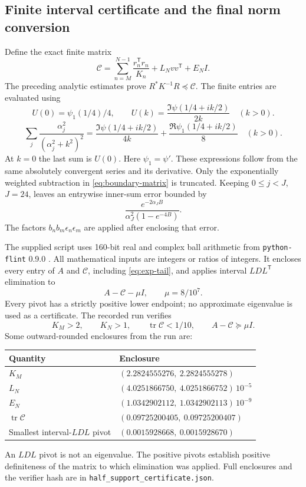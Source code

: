 \documentclass[11pt]{article}
\begin{document}
\subsection{Finite interval certificate and the final norm conversion}
Define the exact finite matrix
\begin{equation}\label{eq:Cbound}
 \mathcal C=\sum_{n=M}^{N-1}\frac{r_n^{\mathsf T}r_n}{K_n}
                  +L_Nvv^{\mathsf T}+E_NI.
\end{equation}
The preceding analytic estimates prove
$R^*K^{-1}R\preceq\mathcal C$.
The finite entries are evaluated using
\[
 U(0)=\psi_1(1/4)/4,\qquad
 U(k)=\frac{\Im\psi(1/4+ik/2)}{2k}\quad(k>0).
\]
\[
 \sum_j\frac{\alpha_j^2}{(\alpha_j^2+k^2)^2}
 =\frac{\Im\psi(1/4+ik/2)}{4k}
       +\frac{\Re\psi_1(1/4+ik/2)}8\quad(k>0).
\]
At $k=0$ the last sum is $U(0)$. Here $\psi_1=\psi'$.
These expressions follow from the same absolutely convergent series
and its derivative. Only the exponentially weighted subtraction in
\eqref{eq:boundary-matrix} is truncated. Keeping $0\le j<J$, $J=24$,
leaves an entrywise inner-sum error bounded by
\begin{equation}\label{eq:exp-tail}
 \frac{e^{-2\alpha_JB}}{\alpha_J^2(1-e^{-4B})}.
\end{equation}
The factors $b_nb_m\epsilon_n\epsilon_m$ are applied after enclosing
that error.

The supplied script uses 160-bit real and complex ball arithmetic
from \texttt{python-flint} 0.9.0 \cite{pythonflint}. All mathematical
inputs are integers or ratios of integers. It encloses every entry of
$A$ and $\mathcal C$, including \eqref{eq:exp-tail}, and applies interval
$LDL^{\mathsf T}$ elimination to
\[
 A-\mathcal C-\mu I,\qquad \mu=8/10^7.
\]
Every pivot has a strictly positive lower endpoint; no approximate
eigenvalue is used as a certificate. The recorded run verifies
\begin{equation}\label{eq:certified-tests}
 K_M>2,\qquad K_N>1,\qquad
 \operatorname{tr}\mathcal C<1/10,\qquad A-\mathcal C\succeq\mu I.
\end{equation}
Some outward-rounded enclosures from the run are:
\begin{center}
\begin{tabular}{@{}ll@{}}
\toprule
Quantity&Enclosure\\\midrule
$K_M$&$(2.2824555276,\ 2.2824555278)$\\
$L_N$&$(4.0251866750,\ 4.0251866752)\,10^{-5}$\\
$E_N$&$(1.0342902112,\ 1.0342902113)\,10^{-9}$\\
$\operatorname{tr}\mathcal C$&$(0.09725200405,\ 0.09725200407)$\\
Smallest interval-$LDL$ pivot&$(0.0015928668,\ 0.0015928670)$\\
\bottomrule
\end{tabular}
\end{center}
An $LDL$ pivot is not an eigenvalue. The positive pivots establish
positive definiteness of the matrix to which elimination was applied.
Full enclosures and the verifier hash are in
\texttt{half\_support\_certificate.json}.
\end{document}
